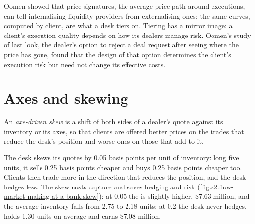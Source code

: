 Oomen showed that price signatures, the average price path around executions, can tell internalising liquidity providers from externalising ones;
the same curves, computed by client, are what a desk tiers on. Tiering has a mirror image: a client's execution quality depends on how its dealers
manage risk. Oomen's study of last look, the dealer's option to reject a deal request after seeing where the price has gone, found that the design
of that option determines the client's execution risk but need not change its effective costs.

\section{Axes and skewing}

\begin{definition}\label{def:s2:flow-market-making-at-a-bank:skew}
An \emph{axe-driven skew} is a shift of both sides of a dealer's quote against its inventory or its axes, so that clients are
offered better prices on the trades that reduce the desk's position and worse ones on those that add to it.
\end{definition}

The desk skews its quotes by 0.05 basis points per unit of inventory: long five units, it sells 0.25 basis points cheaper and buys 0.25 basis
points cheaper too. Clients then trade more in the direction that reduces the position, and the desk hedges less. The skew costs capture and saves
hedging and risk (\cref{fig:s2:flow-market-making-at-a-bank:skew}): at 0.05 the  is slightly higher, \$7.63 million, and the average
inventory falls from 2.75 to 2.18 units; at 0.2 the desk never hedges, holds 1.30 units on average and earns \$7.08 million.

